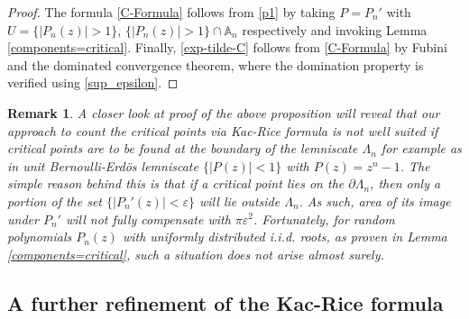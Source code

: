 \documentclass[9pt,a4paper,reqno]{amsart}
\theoremstyle{mine}
\newtheorem{remark}[thm]{Remark}
\theoremstyle{definition}
\theoremstyle{remark}
\renewcommand\epsilon{\varepsilon}
\newcommand{\mb}{\mathbb}
\begin{document}
\begin{proof}
The formula \eqref{C-Formula} follows from \eqref{p1} by taking $P = P_n'$ with $U = \{ |P_n(z)| >1 \}$, $\{ |P_n(z)| >1 \}\cap \mb{A}_n$ respectively and invoking Lemma \ref{components=critical}. Finally, \eqref{exp-tilde-C} follows from \eqref{C-Formula} by Fubini and the dominated convergence theorem, where the domination property is verified using \eqref{sup_epsilon}. 
\end{proof}



\begin{remark}\label{a-good-remark}
    A closer look at proof of the above proposition will reveal that our approach to count the critical points via Kac-Rice formula is not well suited if critical points are to be found at the boundary of the lemniscate $\Lambda_n$ for example as in unit Bernoulli-Erd\"os lemniscate $\{ |P(z)| <1 \}$ with $P(z) = z^n-1$. The simple reason behind this is that if a critical point lies on the $\partial \Lambda_n$, then only a portion of the set $\{|P_n'(z)| <\epsilon\}$ will lie outside $\Lambda_n$. As such, area of its image under $P_n'$ will not fully compensate with $\pi \epsilon^2$. Fortunately, for random polynomials $P_n(z)$ with uniformly distributed i.i.d. roots, as proven in Lemma \ref{components=critical}, such a situation does not arise almost surely.    
\end{remark}


\subsection{A further refinement of the Kac-Rice formula}
\end{document}
